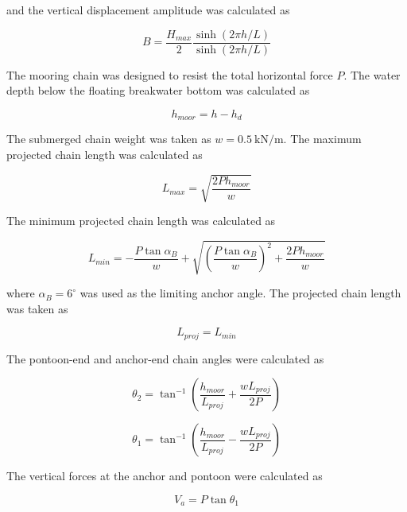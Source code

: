 \documentclass[a4paper, 11pt]{article}
\begin{document}
and the vertical displacement amplitude was calculated as

\begin{equation}
    B=
    \frac{H_{max}}{2}
    \frac{\sinh(2\pi h/L)}{\sinh(2\pi h/L)}
\end{equation}

The mooring chain was designed to resist the total horizontal force \(P\). The water depth below the floating breakwater bottom was calculated as

\begin{equation}
    h_{moor}=h-h_d
\end{equation}

The submerged chain weight was taken as \(w=0.5~\mathrm{kN/m}\). The maximum projected chain length was calculated as

\begin{equation}
    L_{max}=\sqrt{\frac{2Ph_{moor}}{w}}
\end{equation}

The minimum projected chain length was calculated as

\begin{equation}
    L_{min}
    =
    -\frac{P\tan\alpha_B}{w}
    +
    \sqrt{
    \left(
    \frac{P\tan\alpha_B}{w}
    \right)^2
    +
    \frac{2Ph_{moor}}{w}
    }
\end{equation}

where \(\alpha_B=6^{\circ}\) was used as the limiting anchor angle. The projected chain length was taken as

\begin{equation}
    L_{proj}=L_{min}
\end{equation}

The pontoon-end and anchor-end chain angles were calculated as

\begin{equation}
    \theta_2=
    \tan^{-1}
    \left(
    \frac{h_{moor}}{L_{proj}}
    +
    \frac{wL_{proj}}{2P}
    \right)
\end{equation}

\begin{equation}
    \theta_1=
    \tan^{-1}
    \left(
    \frac{h_{moor}}{L_{proj}}
    -
    \frac{wL_{proj}}{2P}
    \right)
\end{equation}

The vertical forces at the anchor and pontoon were calculated as

\begin{equation}
    V_a=P\tan\theta_1
\end{equation}
\end{document}
